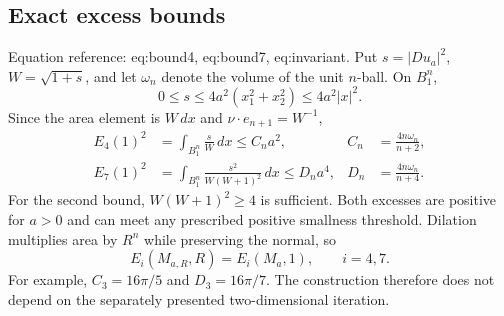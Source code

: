 \documentclass[10pt]{article}
\begin{document}
\subsection*{Exact excess bounds}
Equation reference: eq:bound4, eq:bound7, eq:invariant. Put \(s=|Du_a|^2\), \(W=\sqrt{1+s}\), and let \(\omega_n\) denote the volume of the unit \(n\)-ball. On \(B_1^n\), \[0\le s\le4a^2(x_1^2+x_2^2)\le4a^2|x|^2.\] Since the area element is \(W\,dx\) and \(\nu\cdot e_{n+1}=W^{-1}\), \[\begin{aligned}
 E_4(1)^2&=\int_{B_1^n}\frac{s}{W}\,dx
 \le C_n a^2,& C_n&=\frac{4n\omega_n}{n+2},\\
 E_7(1)^2&=\int_{B_1^n}\frac{s^2}{W(W+1)^2}\,dx
 \le D_n a^4,& D_n&=\frac{4n\omega_n}{n+4}.\end{aligned}\] For the second bound, \(W(W+1)^2\ge4\) is sufficient. Both excesses are positive for \(a>0\) and can meet any prescribed positive smallness threshold. Dilation multiplies area by \(R^n\) while preserving the normal, so \[
 E_i(M_{a,R},R)=E_i(M_a,1),\qquad i=4,7.\] For example, \(C_3=16\pi/5\) and \(D_3=16\pi/7\). The construction therefore does not depend on the separately presented two-dimensional iteration.\par
\end{document}
